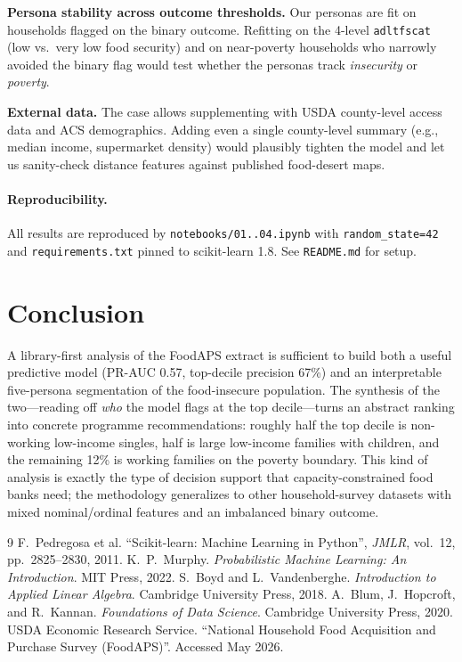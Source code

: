 \documentclass[10pt,letterpaper]{article}
\begin{document}
\textbf{Persona stability across outcome thresholds.} Our personas are
fit on households flagged on the binary outcome.  Refitting on the
4-level \texttt{adltfscat} (low vs.\ very low food security) and on
near-poverty households who narrowly avoided the binary flag would
test whether the personas track \emph{insecurity} or \emph{poverty}.

\textbf{External data.} The case allows supplementing with USDA
county-level access data and ACS demographics.  Adding even a single
county-level summary (e.g., median income, supermarket density) would
plausibly tighten the model and let us sanity-check distance
features against published food-desert maps.

\paragraph{Reproducibility.}  All results are reproduced by
\texttt{notebooks/01..04.ipynb} with \texttt{random\_state=42} and
\texttt{requirements.txt} pinned to scikit-learn 1.8.  See
\texttt{README.md} for setup.

\section{Conclusion}
A library-first analysis of the FoodAPS extract is sufficient to
build both a useful predictive model (PR-AUC 0.57, top-decile
precision 67\%) and an interpretable five-persona segmentation of the
food-insecure population.  The synthesis of the two---reading off
\emph{who} the model flags at the top decile---turns an abstract
ranking into concrete programme recommendations: roughly half the
top decile is non-working low-income singles, half is large
low-income families with children, and the remaining 12\% is working
families on the poverty boundary.  This kind of analysis is exactly
the type of decision support that capacity-constrained food banks
need; the methodology generalizes to other household-survey datasets
with mixed nominal/ordinal features and an imbalanced binary
outcome.

\begin{thebibliography}{9}
\small
{} F.~Pedregosa et al.  ``Scikit-learn: Machine Learning
in Python'', \emph{JMLR}, vol.~12, pp.~2825--2830, 2011.
 K.~P.~Murphy.  \emph{Probabilistic Machine Learning:
An Introduction}.  MIT Press, 2022.
 S.~Boyd and L.~Vandenberghe.  \emph{Introduction to
Applied Linear Algebra}.  Cambridge University Press, 2018.
 A.~Blum, J.~Hopcroft, and R.~Kannan.  \emph{Foundations
of Data Science}.  Cambridge University Press, 2020.
 USDA Economic Research Service.  ``National
Household Food Acquisition and Purchase Survey (FoodAPS)''.
Accessed May 2026.
\end{thebibliography}
\end{document}
